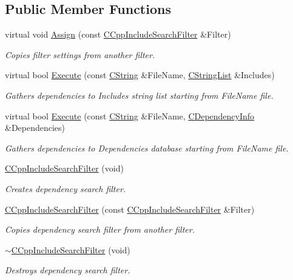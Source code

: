 \subsection*{Public Member Functions}
\begin{DoxyCompactItemize}
\item 
virtual void \hyperlink{classCCppIncludeSearchFilter_a841ef5c22cdb587cc00e698312012944}{Assign} (const \hyperlink{classCCppIncludeSearchFilter}{C\-Cpp\-Include\-Search\-Filter} \&Filter)
\begin{DoxyCompactList}\small\item\em Copies filter settings from another filter. \end{DoxyCompactList}\item 
virtual bool \hyperlink{classCCppIncludeSearchFilter_a847f213a3ab4d7220a1ee0a095a5f42f}{Execute} (const \hyperlink{classCString}{C\-String} \&File\-Name, \hyperlink{classCStringList}{C\-String\-List} \&Includes)
\begin{DoxyCompactList}\small\item\em Gathers dependencies to {\itshape Includes} string list starting from {\itshape File\-Name} file. \end{DoxyCompactList}\item 
virtual bool \hyperlink{classCCppIncludeSearchFilter_ac37bc3584c554db6a7964c8e9de31636}{Execute} (const \hyperlink{classCString}{C\-String} \&File\-Name, \hyperlink{classCDependencyInfo}{C\-Dependency\-Info} \&Dependencies)
\begin{DoxyCompactList}\small\item\em Gathers dependencies to {\itshape Dependencies} database starting from {\itshape File\-Name} file. \end{DoxyCompactList}\item 
\hyperlink{classCCppIncludeSearchFilter_afc83d326ec4699a54887bad165609690}{C\-Cpp\-Include\-Search\-Filter} (void)
\begin{DoxyCompactList}\small\item\em Creates dependency search filter. \end{DoxyCompactList}\item 
\hyperlink{classCCppIncludeSearchFilter_a978515421bf849a4169e52e8977cdcfb}{C\-Cpp\-Include\-Search\-Filter} (const \hyperlink{classCCppIncludeSearchFilter}{C\-Cpp\-Include\-Search\-Filter} \&Filter)
\begin{DoxyCompactList}\small\item\em Copies dependency search filter from another filter. \end{DoxyCompactList}\item 
\hyperlink{classCCppIncludeSearchFilter_a64b222a54f46b366998decad4a953451}{$\sim$\-C\-Cpp\-Include\-Search\-Filter} (void)
\begin{DoxyCompactList}\small\item\em Destroys dependency search filter. \end{DoxyCompactList}\end{DoxyCompactItemize}
